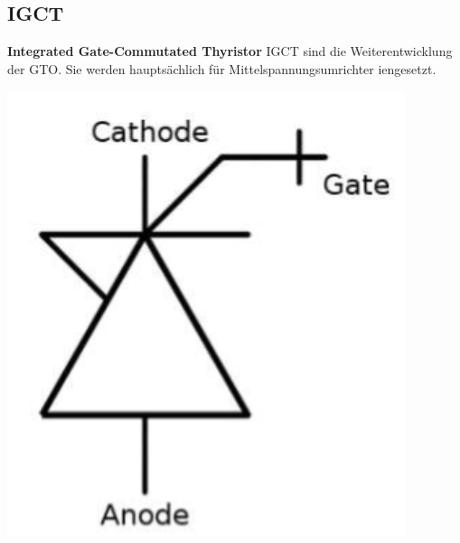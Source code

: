 \begin{minipage}{0.5\linewidth}
    \subsection{IGCT}
    \begin{minipage}{0.7\linewidth}
        \textbf{Integrated Gate-Commutated Thyristor}
        IGCT sind die Weiterentwicklung der GTO.\newline
        Sie werden hauptsächlich für Mittelspannungsumrichter iengesetzt.
    \end{minipage}
    \begin{minipage}{0.2\linewidth}
        \includegraphics[width=\linewidth]{images/IGCTSymbol}
    \end{minipage} 
\end{minipage}
\clearpage
